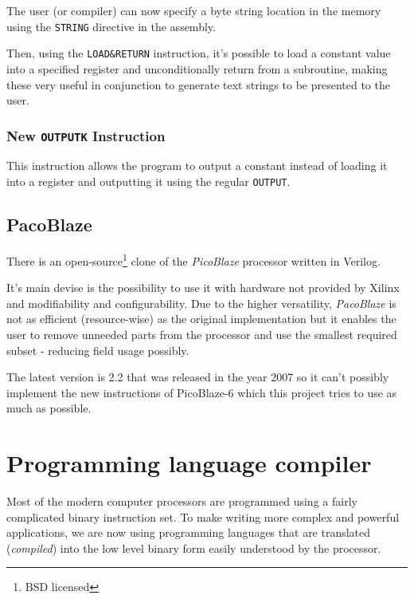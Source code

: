         The user (or compiler) can now specify a byte string location in the memory using the \texttt{STRING} directive in the assembly.

        Then, using the \texttt{LOAD\&RETURN} instruction, it's possible to load a constant value into a specified register and unconditionally return from a subroutine, making these very useful in conjunction to generate text strings to be presented to the user.

        \subsection{New \texttt{OUTPUTK} Instruction}

        This instruction allows the program to output a constant instead of loading it into a register and outputting it using the regular \texttt{OUTPUT}.

    \section{PacoBlaze}

    There is an open-source\footnote{BSD licensed} clone of the \emph{PicoBlaze} processor written in Verilog.

    It's main devise is the possibility to use it with hardware not provided by Xilinx and modifiability and configurability. Due to the higher versatility, \emph{PacoBlaze} is not as efficient (resource-wise) as the original implementation but it enables the user to remove unneeded parts from the processor and use the smallest required subset - reducing field usage possibly.

    The latest version is 2.2 that was released in the year 2007 so it can't possibly implement the new instructions of PicoBlaze-6 which this project tries to use as much as possible.

\chapter{Programming language compiler}

Most of the modern computer processors are programmed using a fairly complicated binary instruction set. To make writing more complex and powerful applications, we are now using programming languages that are translated (\emph{compiled}) into the low level binary form easily understood by the processor.


